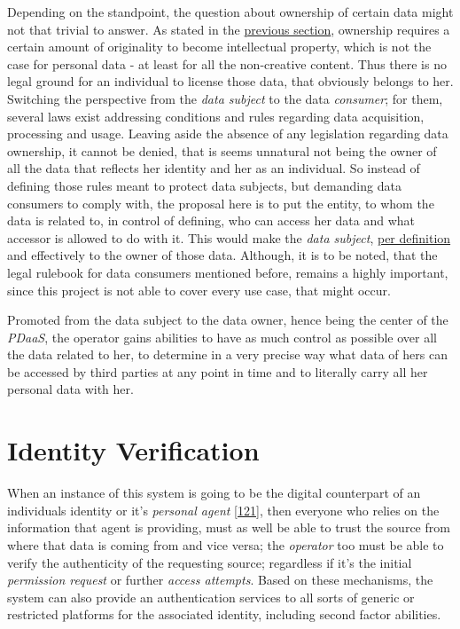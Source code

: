 \documentclass[12pt,english,a4paper,titlepage,cleardoublepage=empty,dottedtoc]{report}
\begin{document}
Depending on the standpoint, the question about ownership of certain
data might not that trivial to answer. As stated in the
\protect\hyperlink{digital-identity-personal-data-and-ownership}{previous
section}, ownership requires a certain amount of originality to become
intellectual property, which is not the case for personal data - at
least for all the non-creative content. Thus there is no legal ground
for an individual to license those data, that obviously belongs to her.
Switching the perspective from the \emph{data subject} to the data
\emph{consumer}; for them, several laws exist addressing conditions and
rules regarding data acquisition, processing and usage. Leaving aside
the absence of any legislation regarding data ownership, it cannot be
denied, that is seems unnatural not being the owner of all the data that
reflects her identity and her as an individual. So instead of defining
those rules meant to protect data subjects, but demanding data consumers
to comply with, the proposal here is to put the entity, to whom the data
is related to, in control of defining, who can access her data and what
accessor is allowed to do with it. This would make the \emph{data
subject}, \protect\hyperlink{def-ownership}{per definition} and
effectively to the owner of those data. Although, it is to be noted,
that the legal rulebook for data consumers mentioned before, remains a
highly important, since this project is not able to cover every use
case, that might occur.

Promoted from the data subject to the data owner, hence being the center
of the \emph{PDaaS}, the operator gains abilities to have as much
control as possible over all the data related to her, to determine in a
very precise way what data of hers can be accessed by third parties at
any point in time and to literally carry all her personal data with her.

\section{Identity Verification}\label{identity-verification}

When an instance of this system is going to be the digital counterpart
of an individuals identity or it's \emph{personal agent}
{[}\protect\hyperlink{ref-book_2015_ethical-it-innovation}{121}{]}, then
everyone who relies on the information that agent is providing, must as
well be able to trust the source from where that data is coming from and
vice versa; the \emph{operator} too must be able to verify the
authenticity of the requesting source; regardless if it's the initial
\emph{permission request} or further \emph{access attempts}. Based on
these mechanisms, the system can also provide an authentication services
to all sorts of generic or restricted platforms for the associated
identity, including second factor abilities.
\end{document}
